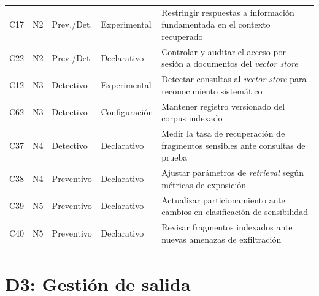 \begin{longtable}{@{}l c l l L{6.5cm}@{}}
  C17 & N2 & Prev./Det.         & Experimental  & Restringir respuestas a información fundamentada en el contexto recuperado \\
  C22 & N2 & Prev./Det.         & Declarativo   & Controlar y auditar el acceso por sesión a documentos del \textit{vector store} \\
  C12 & N3 & Detectivo          & Experimental  & Detectar consultas al \textit{vector store} para reconocimiento sistemático \\
  C62 & N3 & Detectivo          & Configuración & Mantener registro versionado del corpus indexado \\
  C37 & N4 & Detectivo          & Declarativo   & Medir la tasa de recuperación de fragmentos sensibles ante consultas de prueba \\
  C38 & N4 & Preventivo         & Declarativo   & Ajustar parámetros de \textit{retrieval} según métricas de exposición \\
  C39 & N5 & Preventivo         & Declarativo   & Actualizar particionamiento ante cambios en clasificación de sensibilidad \\
  C40 & N5 & Preventivo         & Declarativo   & Revisar fragmentos indexados ante nuevas amenazas de exfiltración \\
\end{longtable}

\section*{D3: Gestión de salida}

